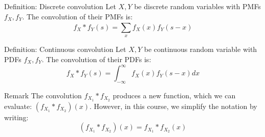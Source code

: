 \documentclass[a4paper]{article}
\begin{document}
\begin{parag}{Definition: Discrete convolution}
    Let $X, Y$ be discrete random variables with PMFs $f_X, f_Y$. The convolution of their PMFs is: 
    \[f_X * f_Y\left(s\right) = \sum_{x}^{} f_X\left(x\right)f_Y\left(s- x\right)\]
    
\end{parag}

\begin{parag}{Definition: Continuous convolution}
    Let $X, Y$ be continuous random variable with PDFs $f_X, f_Y$. The convolution of their PDFs is: 
    \[f_X * f_Y\left(s\right) = \int_{-\infty}^{\infty} f_X\left(x\right)f_Y\left(s- x\right)dx\]
\end{parag}

\begin{parag}{Remark}
    The convolution $f_{X_1} * f_{X_2}$ produces a new function, which we can evaluate: $\left(f_{X_1}* f_{X_2}\right)\left(x\right)$. However, in this course, we simplify the notation by writing: 
    \[\left(f_{X_1}* f_{X_2}\right)\left(x\right) = f_{X_1}* f_{X_2}\left(x\right)\]
\end{parag}
\end{document}
